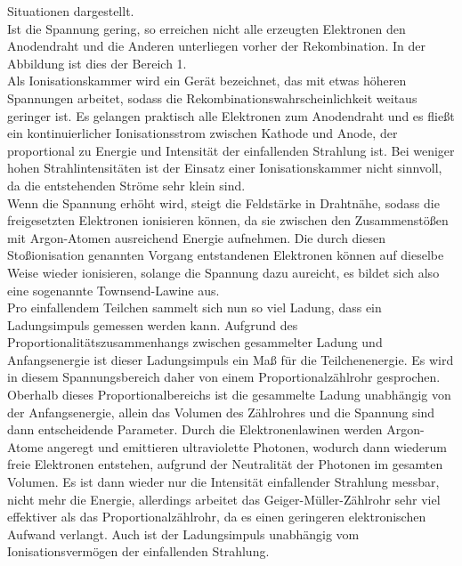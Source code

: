 Situationen dargestellt.\\
Ist die Spannung gering, so erreichen nicht alle erzeugten Elektronen den Anodendraht
und die Anderen unterliegen vorher der Rekombination. In der Abbildung ist
dies der Bereich 1.\\
Als Ionisationskammer wird ein Gerät bezeichnet, das mit etwas höheren Spannungen
arbeitet, sodass die Rekombinationswahrscheinlichkeit weitaus geringer ist.
Es gelangen praktisch alle Elektronen zum Anodendraht und es fließt ein kontinuierlicher
Ionisationsstrom zwischen Kathode und Anode, der proportional zu Energie und
Intensität der einfallenden Strahlung ist. Bei weniger hohen Strahlintensitäten
ist der Einsatz einer Ionisationskammer nicht sinnvoll, da die entstehenden Ströme 
sehr klein sind.\\
Wenn die Spannung erhöht wird, steigt die Feldstärke in Drahtnähe, sodass die 
freigesetzten Elektronen ionisieren können, da sie zwischen den Zusammenstößen 
mit Argon-Atomen ausreichend Energie aufnehmen. Die durch diesen Stoßionisation genannten
Vorgang entstandenen Elektronen können auf dieselbe Weise wieder ionisieren,
solange die Spannung dazu aureicht, es bildet sich also eine sogenannte Townsend-Lawine
aus. \\
Pro einfallendem Teilchen sammelt sich nun so viel Ladung, dass ein Ladungsimpuls 
gemessen werden kann. Aufgrund des Proportionalitätszusammenhangs zwischen
gesammelter Ladung und Anfangsenergie ist dieser Ladungsimpuls ein Maß für 
die Teilchenenergie. Es wird in diesem Spannungsbereich daher von einem 
Proportionalzählrohr gesprochen.\\
Oberhalb dieses Proportionalbereichs ist die gesammelte Ladung unabhängig 
von der Anfangsenergie, allein das Volumen des Zählrohres und die Spannung sind
dann entscheidende Parameter. Durch die Elektronenlawinen werden Argon-Atome angeregt
und emittieren ultraviolette Photonen, wodurch dann wiederum 
freie Elektronen entstehen, aufgrund der Neutralität der Photonen im gesamten Volumen.
Es ist dann wieder nur die Intensität einfallender Strahlung messbar, nicht mehr
die Energie, allerdings arbeitet das Geiger-Müller-Zählrohr sehr viel effektiver als
das Proportionalzählrohr, da es einen geringeren elektronischen Aufwand verlangt.
Auch ist der Ladungsimpuls unabhängig vom Ionisationsvermögen der einfallenden Strahlung.

